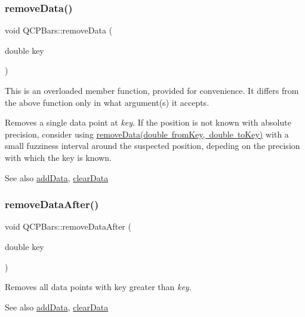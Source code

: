\subsubsection{\texorpdfstring{remove\+Data()}{removeData()}\hspace{0.1cm}{\footnotesize\ttfamily [2/2]}}
{\footnotesize\ttfamily void Q\+C\+P\+Bars\+::remove\+Data (\begin{DoxyParamCaption}\item[{double}]{key }\end{DoxyParamCaption})}

This is an overloaded member function, provided for convenience. It differs from the above function only in what argument(s) it accepts.

Removes a single data point at {\itshape key}. If the position is not known with absolute precision, consider using \mbox{\hyperlink{class_q_c_p_bars_a1fe9bcb57d670defea1bb65cadf43765}{remove\+Data(double from\+Key, double to\+Key)}} with a small fuzziness interval around the suspected position, depeding on the precision with which the key is known.

\begin{DoxySeeAlso}{See also}
\mbox{\hyperlink{class_q_c_p_bars_a1f29cf08615040993209147fa68de3f2}{add\+Data}}, \mbox{\hyperlink{class_q_c_p_bars_a11dbbd707132f07f862dff13c5789c2b}{clear\+Data}} 
\end{DoxySeeAlso}
\mbox{\label{class_q_c_p_bars_a99de6e7abbbf03fb41fa604c7f08aa8b}} 
\subsubsection{\texorpdfstring{remove\+Data\+After()}{removeDataAfter()}}
{\footnotesize\ttfamily void Q\+C\+P\+Bars\+::remove\+Data\+After (\begin{DoxyParamCaption}\item[{double}]{key }\end{DoxyParamCaption})}

Removes all data points with key greater than {\itshape key}. \begin{DoxySeeAlso}{See also}
\mbox{\hyperlink{class_q_c_p_bars_a1f29cf08615040993209147fa68de3f2}{add\+Data}}, \mbox{\hyperlink{class_q_c_p_bars_a11dbbd707132f07f862dff13c5789c2b}{clear\+Data}} 
\end{DoxySeeAlso}
\mbox{\label{class_q_c_p_bars_a9d12779a3fad4820aad2c428f368298d}} 
